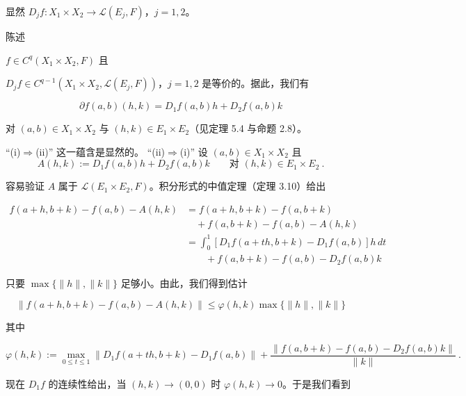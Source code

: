 \begin{remark}

\begin{items}
\item

显然 $ D_{j}f:X_{1}\times X_{2}\to\mathcal{L}(E_{j},F) $，$ j=1,2 $。

\item

陈述

\begin{subitems}
\item

$ f\in C^{q}(X_{1}\times X_{2},F) $ 且

\item

$ D_{j}f\in C^{q-1}(X_{1}\times X_{2},\mathcal{L}(E_{j},F)) $，$ j=1,2 $
是等价的。据此，我们有

\[
\partial f(a,b)(h,k)=D_{1}f(a,b)h+D_{2}f(a,b)k
\]

对 $ (a,b)\in X_{1}\times X_{2} $ 与 $ (h,k)\in E_{1}\times E_{2} $（见定理 5.4 与命题 2.8）。

\proofhead
“(i)$ \Rightarrow $(ii)” 这一蕴含是显然的。
“(ii)$ \Rightarrow $(i)” 设 $ (a,b)\in X_{1}\times X_{2} $ 且
\[
A(h,k):=D_{1}f(a,b)h+D_{2}f(a,b)k\qquad\text{对 }(h,k)\in E_{1}\times E_{2} \ .
\]

容易验证 $ A $ 属于 $ \mathcal{L}(E_{1}\times E_{2},F) $。积分形式的中值定理（定理 3.10）给出

\begin{equation*}
\begin{aligned}
f(a+h,b+k)-f(a,b)-A(h,k)&=f(a+h,b+k)-f(a,b+k)\\ &\quad{}+f(a,b+k)-f(a,b)-A(h,k)\\ &=\int_{0}^{1}\left[D_{1}f(a+th,b+k)-D_{1}f(a,b)\right]h\,dt\\ &\qquad{}+f(a,b+k)-f(a,b)-D_{2}f(a,b)k
\end{aligned}
\end{equation*}

只要 $ \max\{\|h\|,\|k\|\} $ 足够小。由此，我们得到估计

\[
\|f(a+h,b+k)-f(a,b)-A(h,k)\|\le\varphi(h,k)\max\{\|h\|,\|k\|\}
\]

其中

\[
\varphi(h,k):=\max_{0\le t\le 1}\|D_{1}f(a+th,b+k)-D_{1}f(a,b)\|+\frac{\|f(a,b+k)-f(a,b)-D_{2}f(a,b)k\|}{\|k\|}\ .
\]

现在 $ D_{1}f $ 的连续性给出，当 $ (h,k)\to(0,0) $ 时 $ \varphi(h,k)\to 0 $。于是我们看到


\end{subitems}
\end{items}
\end{remark}
